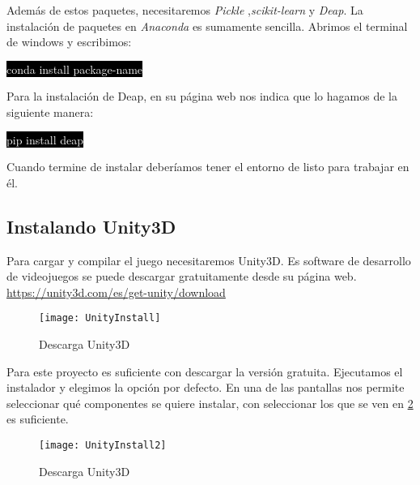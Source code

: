 Además de estos paquetes, necesitaremos \emph{Pickle} ,\emph{scikit-learn} y \emph{Deap}. La instalación de paquetes en \emph{Anaconda} es sumamente sencilla. Abrimos el terminal de windows y escribimos:

\colorbox{black}{\textcolor{white}{conda install package-name}}

Para la instalación de Deap, en su página web nos indica que lo hagamos de la siguiente manera:

\colorbox{black}{\textcolor{white}{pip install deap}}



Cuando termine de instalar deberíamos tener el entorno de  listo para trabajar en él.

\subsection{Instalando Unity3D}

Para cargar y compilar el juego necesitaremos Unity3D. Es software de desarrollo de videojuegos se puede descargar gratuitamente desde su página web. \url{https://unity3d.com/es/get-unity/download}

\begin{figure}[h!]
    \centering
    \texttt{[image: UnityInstall]}
    \caption{Descarga Unity3D}
    \label{fig:Unity}
\end{figure}

Para este proyecto es suficiente con descargar la versión gratuita. Ejecutamos el instalador y elegimos la opción por defecto. En una de las pantallas nos permite seleccionar qué componentes se quiere instalar, con seleccionar los que se ven en \ref{fig:Unity2} es suficiente.

\begin{figure}[h!]
    \centering
    \texttt{[image: UnityInstall2]}
    \caption{Descarga Unity3D}
    \label{fig:Unity2}
\end{figure}


